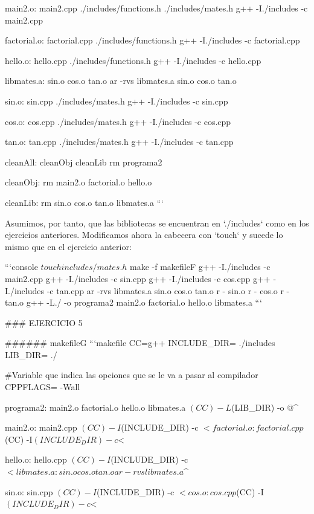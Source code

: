 main2.o: main2.cpp ./includes/functions.h ./includes/mates.h 
	g++ -I./includes -c main2.cpp

factorial.o: factorial.cpp ./includes/functions.h
	g++ -I./includes -c factorial.cpp

hello.o: hello.cpp ./includes/functions.h
	g++ -I./includes -c hello.cpp

libmates.a: sin.o cos.o tan.o
	ar -rvs libmates.a sin.o cos.o tan.o

sin.o: sin.cpp ./includes/mates.h
	g++ -I./includes -c sin.cpp

cos.o: cos.cpp ./includes/mates.h
	g++ -I./includes -c cos.cpp

tan.o: tan.cpp ./includes/mates.h
	g++ -I./includes -c tan.cpp

cleanAll: cleanObj cleanLib
	rm programa2

cleanObj:
	rm main2.o factorial.o hello.o

cleanLib:
	rm sin.o cos.o tan.o libmates.a
```

Asumimos, por tanto, que las bibliotecas se encuentran en `./includes` como en los ejercicios anteriores. Modificamos ahora la cabecera con `touch` y sucede lo mismo que en el ejercicio anterior:

```console
$ touch includes/mates.h 
$ make -f makefileF
  g++ -I./includes -c main2.cpp
  g++ -I./includes -c sin.cpp
  g++ -I./includes -c cos.cpp
  g++ -I./includes -c tan.cpp
  ar -rvs libmates.a sin.o cos.o tan.o
  r - sin.o
  r - cos.o
  r - tan.o
  g++ -L./ -o programa2 main2.o factorial.o hello.o libmates.a
```

### EJERCICIO 5

###### makefileG
```makefile
CC=g++
INCLUDE_DIR= ./includes
LIB_DIR= ./

#Variable que indica las opciones que se le va a pasar al compilador
CPPFLAGS= -Wall

programa2: main2.o factorial.o hello.o libmates.a
	$(CC) -L$(LIB_DIR) -o $@ $^

main2.o: main2.cpp
	$(CC) -I$(INCLUDE_DIR) -c $<

factorial.o: factorial.cpp
	$(CC) -I$(INCLUDE_DIR) -c $<

hello.o: hello.cpp
	$(CC) -I$(INCLUDE_DIR) -c $<

libmates.a: sin.o cos.o tan.o
	ar -rvs libmates.a $^

sin.o: sin.cpp
	$(CC) -I$(INCLUDE_DIR) -c $<

cos.o: cos.cpp
	$(CC) -I$(INCLUDE_DIR) -c $<

